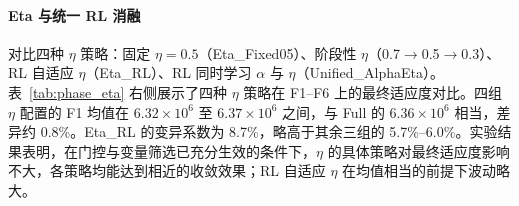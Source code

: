 \documentclass[conference]{IEEEtran}
\begin{document}
\paragraph{Eta 与统一 RL 消融} 对比四种 \(\eta\) 策略：固定 \(\eta=0.5\)（Eta\_Fixed05）、阶段性 \(\eta\)（0.7\(\to\)0.5\(\to\)0.3）、RL 自适应 \(\eta\)（Eta\_RL）、RL 同时学习 \(\alpha\) 与 \(\eta\)（Unified\_AlphaEta）。表~\ref{tab:phase_eta} 右侧展示了四种 \(\eta\) 策略在 F1--F6 上的最终适应度对比。四组 \(\eta\) 配置的 F1 均值在 \(6.32 \times 10^6\) 至 \(6.37 \times 10^6\) 之间，与 Full 的 \(6.36 \times 10^6\) 相当，差异约 0.8\%。Eta\_RL 的变异系数为 8.7\%，略高于其余三组的 5.7\%--6.0\%。实验结果表明，在门控与变量筛选已充分生效的条件下，\(\eta\) 的具体策略对最终适应度影响不大，各策略均能达到相近的收敛效果；RL 自适应 \(\eta\) 在均值相当的前提下波动略大。
\end{document}
